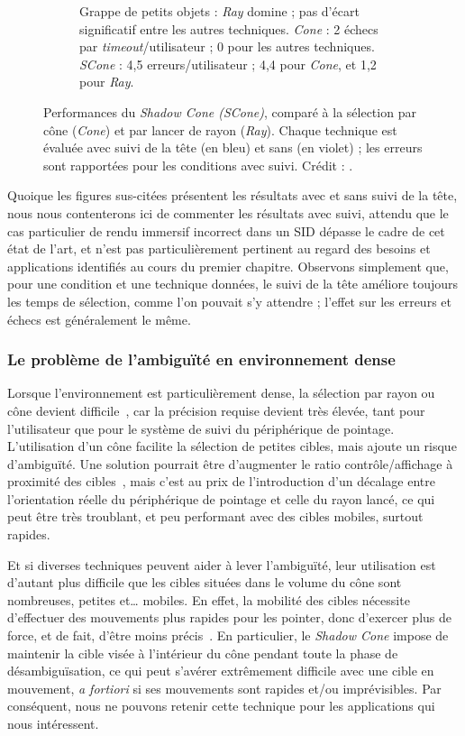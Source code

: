\begin{figure}[!htbp]
\begin{subfigure}[t]{0.49\textwidth}
			\caption{Grappe de petits objets : \emph{Ray} domine ; pas d'écart significatif entre les autres techniques. \emph{Cone} : 2 échecs par \emph{timeout}/utilisateur ; 0 pour les autres techniques. \emph{SCone} : 4,5 erreurs/utilisateur ; 4,4 pour \emph{Cone}, et 1,2 pour \emph{Ray}.}
			\label{fig:shadowCSmall}
		\end{subfigure}
		\caption[Performances du \emph{Shadow Cone}]{Performances du \emph{Shadow Cone (SCone)}, comparé à la sélection par cône (\emph{Cone}) et par lancer de rayon (\emph{Ray}). Chaque technique est évaluée avec suivi de la tête (en bleu) et sans (en violet) ; les erreurs sont rapportées pour les conditions avec suivi. Crédit : \cite{steed20043d}.}
		\label{fig:shadowConePerf}
	\end{figure}
	
	Quoique les figures sus-citées présentent les résultats avec et sans suivi de la tête, nous nous contenterons ici de commenter les résultats avec suivi, attendu que le cas particulier de rendu immersif incorrect dans un SID dépasse le cadre de cet état de l'art, et n'est pas particulièrement pertinent au regard des besoins et applications identifiés au cours du premier chapitre. Observons simplement que, pour une condition et une technique données, le suivi de la tête améliore toujours les temps de sélection, comme l'on pouvait s'y attendre ; l'effet sur les erreurs et échecs est généralement le même.
	
	\subsubsection{Le problème de l'ambiguïté en environnement dense}
	Lorsque l'environnement est particulièrement dense, la sélection par rayon ou cône devient difficile~\cite{kopper2011rapid}, car la précision requise devient très élevée, tant pour l'utilisateur que pour le système de suivi du périphérique de pointage. L'utilisation d'un cône facilite la sélection de petites cibles, mais ajoute un risque d'ambiguïté. Une solution pourrait être d'augmenter le ratio contrôle/affichage à proximité des cibles~\cite{frees2007prism, kopper2010human}, mais c'est au prix de l'introduction d'un décalage entre l'orientation réelle du périphérique de pointage et celle du rayon lancé, ce qui peut être très troublant, et peu performant avec des cibles mobiles, surtout rapides.
	
	Et si diverses techniques peuvent aider à lever l'ambiguïté, leur utilisation est d'autant plus difficile que les cibles situées dans le volume du cône sont nombreuses, petites et\ldots{} mobiles. En effet, la mobilité des cibles nécessite d'effectuer des mouvements plus rapides pour les pointer, donc d'exercer plus de force, et de fait, d'être moins précis~\cite{schmidt1979motor}. En particulier, le \emph{Shadow Cone} impose de maintenir la cible visée à l'intérieur du cône pendant toute la phase de désambiguïsation, ce qui peut s'avérer extrêmement difficile avec une cible en mouvement, \emph{a fortiori} si ses mouvements sont rapides et/ou imprévisibles. Par conséquent, nous ne pouvons retenir cette technique pour les applications qui nous intéressent.
	
